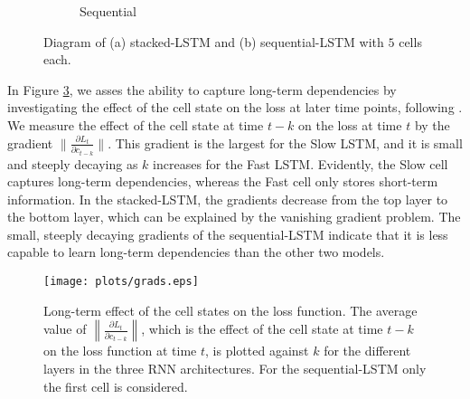 \documentclass{article}
\begin{document}
\begin{figure}
\begin{subfigure}[b]{.55\textwidth}
   \caption{Sequential}
  \label{fig:seq}
\end{subfigure}\caption{Diagram of (a) stacked-LSTM and (b) sequential-LSTM  with $5$ cells each.}
\label{fig:stack-seq}
\end{figure}








In Figure \ref{fig:grads}, we asses the ability to capture long-term dependencies by investigating the effect of the cell state on the loss  at later time points, following \cite{krueger16zoneout}.  We measure the effect of the cell state at time $t-k$ on the loss  at time $t$  by the gradient $\lVert \frac{\partial L_t}{\partial c_{t-k}} \rVert$. This gradient is the largest for the Slow LSTM, and it is small and  steeply decaying as $k$ increases for the Fast LSTM. Evidently, the Slow cell captures long-term dependencies, whereas the Fast cell only stores short-term information.  In the stacked-LSTM, the gradients decrease from the top layer to the bottom layer, which can be explained by the vanishing gradient problem. The small, steeply decaying gradients of the sequential-LSTM  indicate that it is less capable to learn long-term dependencies than the other two models.







\begin{figure}
    \centering
    \texttt{[image: plots/grads.eps]}
    \caption{Long-term effect of  the cell states on the loss function. The average value of $\left\lVert \frac{\partial L_t}{\partial c_{t-k}}\right\rVert$, which is the effect of the cell state at time $t-k$ on the loss function at time $t$, is plotted against $k$ for the different layers in the three RNN architectures.
For the sequential-LSTM only the first cell is considered.}
    \label{fig:grads}
\end{figure}
\end{document}

